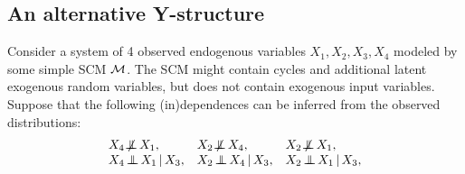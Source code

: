 \subsection{An alternative Y-structure}

Consider a system of 4 observed endogenous variables $X_1,X_2,X_3,X_4$ modeled by some simple SCM $\mathcal{M}$.
The SCM might contain cycles and additional latent exogenous random variables, but does not contain exogenous input variables.
Suppose that the following (in)dependences can be inferred from the observed distributions:
$$\begin{array}{lll}
    X_4 \nIndep X_1,  & X_2 \nIndep X_4, & X_2 \nIndep X_1, \\
    X_4 \Indep X_1 \given X_3, & X_2 \Indep X_4 \given X_3, & X_2 \Indep X_1 \given X_3,
    \end{array}$$

